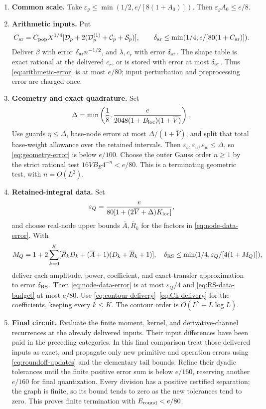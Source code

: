 \begin{enumerate}[leftmargin=*,itemsep=.5em]
\item \textbf{Common scale.}
Take \(\varepsilon_g\le\min(1/2,e/[8(1+A_0)])\).
Then \(\varepsilon_gA_0\le e/8\).

\item \textbf{Arithmetic inputs.}
Put
\[
 C_{\rm ar}=C_{\rm pop}X^{1/4}
       [\mathcal D_p+2(\mathcal D_p^{(1)}+\mathcal C_p+\mathcal S_p)],
 \qquad\delta_{\rm ar}\le\min(1/4,e/[80(1+C_{\rm ar})]).
\]
Deliver \(\beta\) with error \(\delta_{\rm ar}n^{-1/2}\), and
\(\lambda,c_r\) with error \(\delta_{\rm ar}\).
The shape table is exact rational at the delivered \(c_r\), or is
stored with error at most \(\delta_{\rm ar}\). Thus
\eqref{eq:arithmetic-error} is at most \(e/80\); input perturbation
and preprocessing error are charged once.

\item \textbf{Geometry and exact quadrature.}
Set
\[
 \Delta=\min\left(\frac18,
     \frac{e}{2048(1+B_{\rm loc})(1+\overline V)}\right).
\]
Use guards \(\eta\le\Delta\), base-node errors at most
\(\Delta/(1+\overline V)\), and split that total base-weight allowance
over the retained intervals. Then
\(\varepsilon_b,\varepsilon_u,\varepsilon_w\le\Delta\), so
\eqref{eq:geometry-error} is below \(e/100\).
Choose the outer Gauss order \(n\ge1\) by the strict rational test
\(16\overline V\overline B_E4^{-n}<e/80\).
This is a terminating geometric test, with \(n=O(L^2)\).

\item \textbf{Retained-integral data.}
Set
\[
 \varepsilon_Q=\frac{e}{80[1+(2\overline V+\Delta)K_{\rm loc}]},
\]
and choose real-node upper bounds \(\overline A,\overline R_k\)
for the factors in \eqref{eq:node-data-error}. With
\[
 M_Q=1+2\sum_{k=0}^K
  [\overline R_kD_k+(\overline A+1)(D_k+\overline R_k+1)],
 \quad\delta_{\rm RS}\le\min(1/4,\varepsilon_Q/[4(1+M_Q)]),
\]
deliver each amplitude, power, coefficient, and exact-transfer
approximation to error \(\delta_{\rm RS}\).
Then \eqref{eq:node-data-error} is at most \(\varepsilon_Q/4\)
and \eqref{eq:RS-data-budget} at most \(e/80\).
Use \eqref{eq:contour-delivery}--\eqref{eq:Ck-delivery} for the
coefficients, keeping every \(k\le K\).
The contour order is \(O(L^2+L\log L)\).

\item \textbf{Final circuit.}
Evaluate the finite moment, kernel, and derivative-channel recurrences
at the already delivered inputs. Their input differences have been paid
in the preceding categories. In this final comparison treat those
delivered inputs as exact, and propagate only new primitive and operation
errors using \eqref{eq:roundoff-updates} and the elementary tail bounds.
Refine their dyadic tolerances until the finite positive error sum is
below \(e/160\), reserving another \(e/160\) for final quantization.
Every division has a positive certified separation; the graph is finite,
so its bound tends to zero as the new tolerances tend to zero.
This proves finite termination with \(E_{\rm round}<e/80\).
\end{enumerate}
